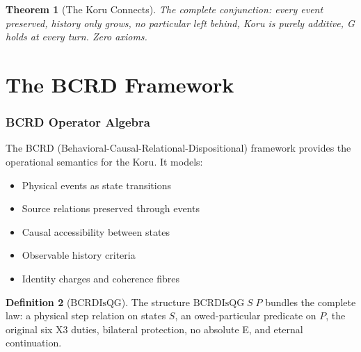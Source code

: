 \documentclass[11pt,a4paper]{article}
\newtheorem{theorem}{Theorem}[section]
\theoremstyle{definition}
\newtheorem{definition}[theorem]{Definition}
\theoremstyle{remark}
\newcommand{\BCRD}{\mathrm{BCRD}}
\begin{document}
\begin{theorem}[The Koru Connects]
The complete conjunction: every event preserved, history only grows, no particular left behind, Koru is purely additive, G holds at every turn. Zero axioms.
\end{theorem}

\part{The BCRD Framework}

\section{BCRD Operator Algebra}
\label{sec:bcrd-algebra}

The BCRD (Behavioral-Causal-Relational-Dispositional) framework provides the operational semantics for the Koru. It models:

\begin{itemize}[nosep]
\item Physical events as state transitions
\item Source relations preserved through events
\item Causal accessibility between states
\item Observable history criteria
\item Identity charges and coherence fibres
\end{itemize}

\begin{definition}[$\BCRD\text{IsQG}$]
\label{def:bcrd-is-qg}
The structure $\BCRD\text{IsQG}\;S\;P$ bundles the complete law: a physical step relation on states $S$, an owed-particular predicate on $P$, the original six X3 duties, bilateral protection, no absolute E, and eternal continuation.
\end{definition}
\end{document}
